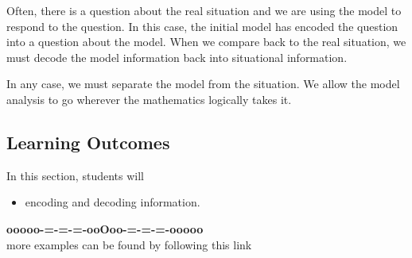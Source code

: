 \documentclass{ximera}
\begin{document}
Often, there is a question about the real situation and we are using the model to respond to the question.  In this case, the initial model has encoded the question into a question about the model.  When we compare back to the real situation, we must decode the model information back into situational information.


In any case, we must separate the model from the situation.  We allow the model analysis to go wherever the mathematics logically takes it.







\subsection*{Learning Outcomes}


\begin{sectionOutcomes}
In this section, students will 

\begin{itemize}
\item encoding and decoding information.
\end{itemize}
\end{sectionOutcomes}









\begin{center}
\textbf{\textcolor{green!50!black}{ooooo-=-=-=-ooOoo-=-=-=-ooooo}} \\

more examples can be found by following this link\\ 

\end{center}
\end{document}
